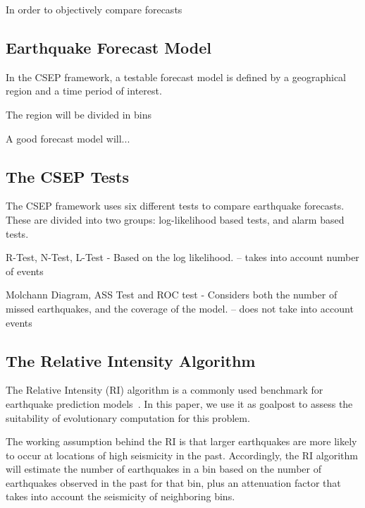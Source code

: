 \documentclass{sig-alternate}
\begin{document}


In order to objectively compare forecasts 

\subsection{Earthquake Forecast Model}

In the CSEP framework, a testable forecast model is defined by a
geographical region and a time period of interest. 

The region will be divided in bins




A good forecast model will...


\subsection{The CSEP Tests}

The CSEP framework uses six different tests to compare earthquake
forecasts. These are divided into two groups: log-likelihood based
tests, and alarm based tests.



R-Test, N-Test, L-Test\cite{Schorlemmer2007} - Based on the log
likelihood. -- takes into account number of events

Molchann Diagram, ASS Test and ROC test\cite{Zechar2010} - Considers both the
number of missed earthquakes, and the coverage of the model. -- does not take into account events


\subsection{The Relative Intensity Algorithm}

The Relative Intensity (RI) algorithm is a commonly used benchmark for
earthquake prediction models~\cite{Nanjo2011}. In this paper, we use
it as goalpost to assess the suitability of evolutionary computation
for this problem.

The working assumption behind the RI is that larger earthquakes are
more likely to occur at locations of high seismicity in the
past. Accordingly, the RI algorithm will estimate the number of
earthquakes in a bin based on the number of earthquakes observed in
the past for that bin, plus an attenuation factor that takes into
account the seismicity of neighboring bins.
\end{document}
